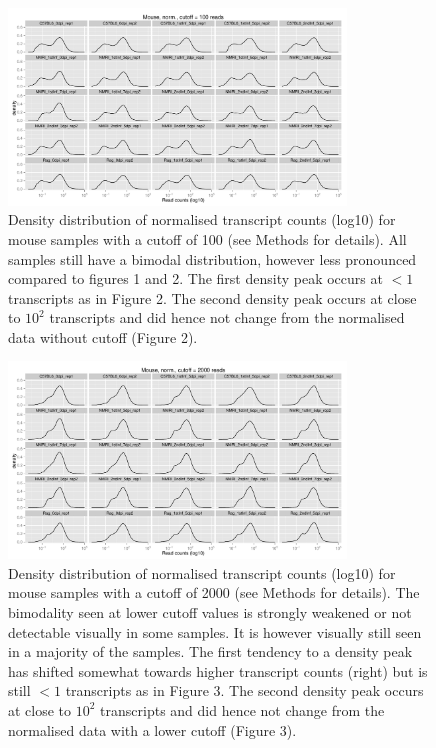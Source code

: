 \documentclass{article}
\begin{document}
\begin{figure}[h]
\begin{center}
  \includegraphics[width=0.8\textwidth]{distributions_normmouse100} %
  \caption{Density distribution of normalised transcript counts
    (log10) for mouse samples with a cutoff of 100 (see Methods for
    details). All samples still have a bimodal distribution, however
    less pronounced compared to figures 1 and 2. The first density
    peak occurs at $<1$ transcripts as in Figure 2. The second density
    peak occurs at close to $10^2$ transcripts and did hence not
    change from the normalised data without cutoff (Figure 2).}
\end{center}
\end{figure}

\begin{figure}[h]
\begin{center}
\includegraphics[width=0.8\textwidth]{distributions_normmouse2000} %
\caption{Density distribution of normalised transcript counts (log10)
  for mouse samples with a cutoff of 2000 (see Methods for
  details). The bimodality seen at lower cutoff values is strongly
  weakened or not detectable visually in some samples. It is however
  visually still seen in a majority of the samples. The first tendency
  to a density peak has shifted somewhat towards higher transcript
  counts (right) but is still $<1$ transcripts as in Figure 3. The
  second density peak occurs at close to $10^2$ transcripts and did
  hence not change from the normalised data with a lower cutoff
  (Figure 3).}
\end{center}
\end{figure}
\end{document}
